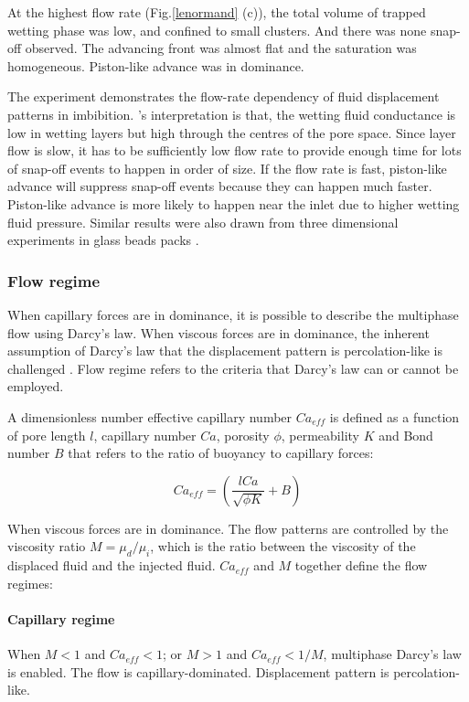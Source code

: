 At the highest flow rate (Fig.\ref{lenormand} (c)), the total volume of trapped wetting phase was low, and confined to small clusters. And there was none snap-off observed. The advancing front was almost flat and the saturation was homogeneous. Piston-like advance was in dominance.

The experiment demonstrates the flow-rate dependency of fluid displacement patterns in imbibition. \citet{blunt2017multiphase}'s interpretation is that, the wetting fluid conductance is low in wetting layers but high through the centres of the pore space. Since layer flow is slow, it has to be sufficiently low flow rate to provide enough time for lots of snap-off events to happen in order of size. If the flow rate is fast, piston-like advance will suppress snap-off events because they can happen much faster. Piston-like advance is more likely to happen near the inlet due to higher wetting fluid pressure. Similar results were also drawn from three dimensional experiments in glass beads packs \citep{datta2014mobilization}.

\subsubsection{Flow regime}
When capillary forces are in dominance, it is possible to describe the multiphase flow using Darcy's law. When viscous forces are in dominance, the inherent assumption of Darcy's law that the displacement pattern is percolation-like is challenged \citep{blunt2017multiphase}. Flow regime refers to the criteria that Darcy's law can or cannot be employed.

A dimensionless number effective capillary number $Ca_{eff}$ is defined as a function of pore length $l$, capillary number $Ca$, porosity $\phi$, permeability $K$ and Bond number $B$ that refers to the ratio of buoyancy to capillary forces:

\begin{equation}
    Ca_{eff}=(\frac{lCa}{\sqrt{\phi K}}+B)
\end{equation}

When viscous forces are in dominance. The flow patterns are controlled by the viscosity ratio $M=\mu_d/ \mu_i$, which is the ratio between the viscosity of the displaced fluid and the injected fluid. $Ca_{eff}$ and $M$ together define the flow regimes\citep{blunt2017multiphase}:

\paragraph{Capillary regime}
When $M<1$ and $Ca_{eff}<1$; or $M>1$ and $Ca_{eff}<1/M$, multiphase Darcy's law is enabled. The flow is capillary-dominated. Displacement pattern is percolation-like.

